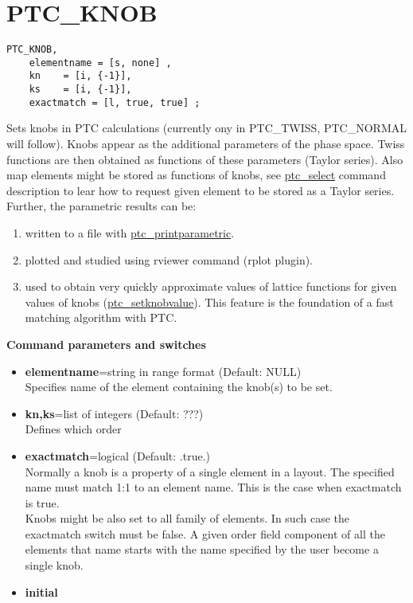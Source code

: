
\section{PTC\_KNOB}

\begin{verbatim}
PTC_KNOB, 
    elementname = [s, none] , 
    kn    = [i, {-1}], 
    ks    = [i, {-1}], 
    exactmatch = [l, true, true] ; 
\end{verbatim}

 Sets knobs in PTC calculations (currently ony in PTC\_TWISS,
 PTC\_NORMAL will follow). Knobs appear as the additional parameters of
 the phase space. Twiss functions are then obtained  as functions of
 these parameters (Taylor series).  Also map elements might be stored as
 functions of knobs, see  \href{PTC_Select.html}{ ptc\_select} command
 description to lear how to request given element to be stored as a
 Taylor series.  \\

Further, the parametric results can be: 
\begin{enumerate}
   \item  written to a file with
     \href{PTC_PrintParametric.html}{ptc\_printparametric}. 
   \item  plotted and studied using rviewer command (rplot plugin). 
   \item  used to obtain very quickly approximate values of lattice
     functions for given values of knobs
     (\href{PTC_SetKnobValue.html}{ptc\_setknobvalue}). This
     feature is the foundation of a fast matching algorithm with
     PTC.      
\end{enumerate}


{\bf Command parameters and switches}
\begin{itemize}
   \item {\bf elementname}=string in range format (Default: NULL)\\
     Specifies name of the element containing the knob(s) to be set.   
   \item {\bf kn,ks}=list of integers (Default: ???)\\
     Defines which order    
   \item {\bf exactmatch}=logical (Default: .true.)\\
     Normally a knob is a property of a single element in a layout.
     The specified name must match 1:1 to an element name. This is the
     case when exactmatch is true.\\  
     Knobs might be also set to all family of elements. In such case
     the exactmatch switch must be false. A given order field
     component of all the elements that name starts with the
     name specified by the user become a single knob.
   \item {\bf initial}
\end{itemize}


